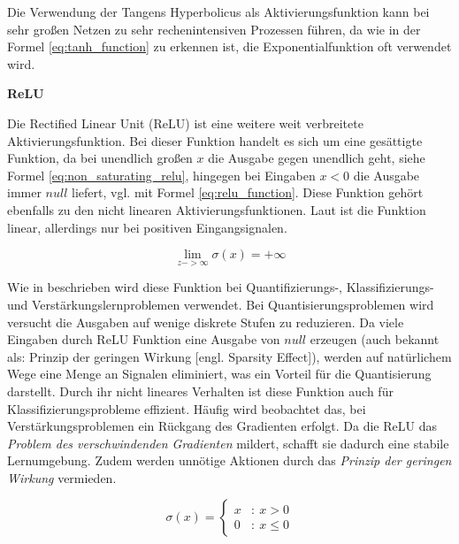 Die Verwendung der Tangens Hyperbolicus als Aktivierungsfunktion kann bei sehr großen Netzen zu sehr rechenintensiven Prozessen führen, da wie in der Formel \ref{eq:tanh_function} zu erkennen ist, die Exponentialfunktion oft verwendet wird.\vspace{0.2cm}

%
\textbf{ReLU}\vspace{0.2cm}


Die Rectified Linear Unit (ReLU) ist eine weitere weit verbreitete Aktivierungsfunktion. Bei dieser Funktion handelt es sich um eine gesättigte Funktion, da bei unendlich großen $x$ die Ausgabe gegen unendlich geht, siehe Formel \ref{eq:non_saturating_relu}, hingegen bei Eingaben $x < 0$ die Ausgabe immer $null$ liefert, vgl. mit Formel \ref{eq:relu_function}. Diese Funktion gehört ebenfalls zu den nicht linearen Aktivierungsfunktionen. Laut \cite{yuen_universal_2021} ist die Funktion linear, allerdings nur bei positiven Eingangsignalen.\vspace{0.2cm}

\begin{equation}\label{eq:non_saturating_relu}
	\lim_{z -> \infty} \sigma(x) = + \infty
\end{equation}

Wie in \cite{yuen_universal_2021} beschrieben wird diese Funktion bei Quantifizierungs-, Klassifizierungs- und Verstärkungslernproblemen verwendet. Bei Quantisierungsproblemen wird versucht die Ausgaben auf wenige diskrete Stufen zu reduzieren. Da viele Eingaben durch ReLU Funktion eine Ausgabe von $null$ erzeugen (auch bekannt als: Prinzip der geringen Wirkung [engl. Sparsity Effect]), werden auf natürlichem Wege eine Menge an Signalen eliminiert, was ein Vorteil für die Quantisierung darstellt. Durch ihr nicht lineares Verhalten ist diese Funktion auch für Klassifizierungsprobleme effizient. Häufig wird beobachtet das, bei Verstärkungsproblemen ein Rückgang des Gradienten erfolgt. Da die ReLU das \textit{Problem des verschwindenden Gradienten} mildert, schafft sie dadurch eine stabile Lernumgebung. Zudem werden unnötige Aktionen durch das \textit{Prinzip der geringen Wirkung} vermieden.

\begin{equation}\label{eq:relu_function}
	\sigma (x) = \left\{
	\begin{array}{cl}
		x & : \ x > 0 \\
		0 & : \ x \leq 0
	\end{array}
	\right.
\end{equation}

